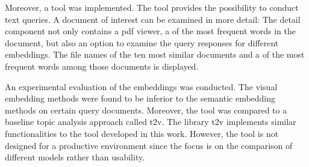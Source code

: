 Moreover, a tool was implemented.
The tool provides the possibility to conduct text queries.
A document of interest can be examined in more detail:
The detail component not only contains a \ac{pdf} viewer, 
a \wordcloud{} of the most frequent words in the document, but also an option to examine the query responses for different embeddings.
The file names of the ten most similar documents and a \wordcloud{} of the most frequent words among those documents is displayed.

An experimental evaluation of the embeddings was conducted.
The visual embedding methods were found to be inferior to the semantic embedding methods on certain query documents.
Moreover, the tool was compared to a baseline topic analysis approach called \ac{t2v}.
The library \ac{t2v} implements similar functionalities to the tool developed in this work.
However, the tool is not designed for a productive environment since the focus is on the comparison of different models rather than usability.